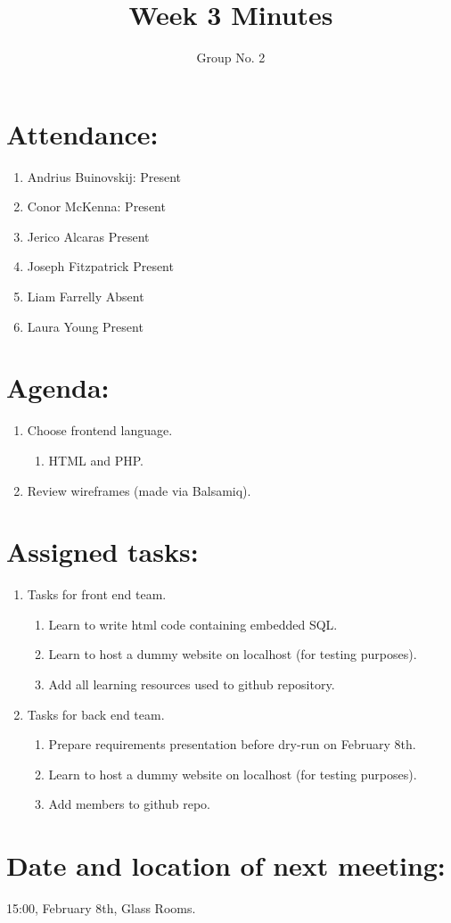 \documentclass[a4paper, 12pt]{article}
\begin{document}
\title{Week 3 Minutes}
\author{Group No. 2}
\maketitle

	\section{Attendance:}
		\begin{enumerate}[label*=\arabic*.]
			\item Andrius Buinovskij:	\dotfill Present
			\item Conor McKenna:		\dotfill Present
			\item Jerico Alcaras		\dotfill Present
			\item Joseph Fitzpatrick	\dotfill Present
			\item Liam Farrelly		\dotfill Absent
			\item Laura Young		\dotfill Present
		\end{enumerate}

	\section{Agenda:}
		\begin{enumerate}[label*=\arabic*.]
			\item Choose frontend language.
			\begin{enumerate}[label*=\arabic*.]
				\item HTML and PHP.
			\end{enumerate}
			\item Review wireframes (made via Balsamiq).
		\end{enumerate}

	\section{Assigned tasks:}
		\begin{enumerate}[label*=\arabic*.]
			\item Tasks for front end team.
			\begin{enumerate}[label*=\arabic*.]
				\item Learn to write html code containing embedded SQL.
				\item Learn to host a dummy website on localhost (for testing purposes).
				\item Add all learning resources used to github repository.
			\end{enumerate}
			\newpage
			\item Tasks for back end team.
			\begin{enumerate}[label*=\arabic*.]
				\item Prepare requirements presentation before dry-run on February 8th.
				\item Learn to host a dummy website on localhost (for testing purposes).
				\item Add members to github repo.
			\end{enumerate}
		\end{enumerate}

	\section{Date and location of next meeting:}
		15:00, February 8th, Glass Rooms.
\end{document}
